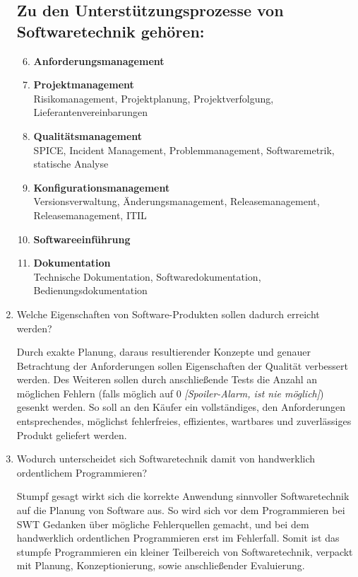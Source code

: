\documentclass{article}
\begin{document}
\begin{enumerate}[label=\alph*.]
            \subsection*{Zu den Unterstützungsprozesse von Softwaretechnik gehören:}
            \begin{enumerate}[label=\arabic*.]
                \setcounter{enumii}{5}
                \item \textbf{Anforderungsmanagement}
                \item \textbf{Projektmanagement}\\
                    Risikomanagement, Projektplanung, Projektverfolgung, Lieferantenvereinbarungen
                \item \textbf{Qualitätsmanagement}\\
                    SPICE, Incident Management, Problemmanagement, Softwaremetrik, statische Analyse
                \item \textbf{Konfigurationsmanagement}\\
                    Versionsverwaltung, Änderungsmanagement, Releasemanagement, Releasemanagement, ITIL
                \item \textbf{Softwareeinführung}
                \item \textbf{Dokumentation}\\
                    Technische Dokumentation, Softwaredokumentation, Bedienungsdokumentation
            \end{enumerate}
        \item Welche Eigenschaften von Software-Produkten sollen dadurch erreicht werden?
            
            Durch exakte Planung, daraus resultierender Konzepte und genauer Betrachtung der Anforderungen sollen Eigenschaften der Qualität verbessert werden.
            Des Weiteren sollen durch anschließende Tests die Anzahl an möglichen Fehlern (falls möglich auf 0 \emph{[Spoiler-Alarm, ist nie möglich]}) gesenkt werden.
            So soll an den Käufer ein vollständiges, den Anforderungen entsprechendes, möglichst fehlerfreies, effizientes, wartbares und zuverlässiges Produkt geliefert werden.
        \item Wodurch unterscheidet sich Softwaretechnik damit von handwerklich ordentlichem Programmieren?
            
            Stumpf gesagt wirkt sich die korrekte Anwendung sinnvoller Softwaretechnik auf die Planung von Software aus.
            So wird sich vor dem Programmieren bei SWT Gedanken über mögliche Fehlerquellen gemacht, und bei dem handwerklich ordentlichen Programmieren erst im Fehlerfall.
            Somit ist das stumpfe Programmieren ein kleiner Teilbereich von Softwaretechnik, verpackt mit Planung, Konzeptionierung, sowie anschließender Evaluierung.
    \end{enumerate}
\end{document}
